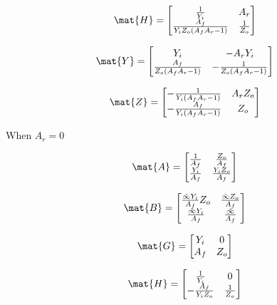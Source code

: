 \documentclass[a4paper, 12pt]{article}
\begin{document}
\begin{equation}
\mat{H} = \left[\begin{matrix}\frac{1}{Y_{i}} & A_{r}\\\frac{A_{f}}{Y_{i} Z_{o} \left(A_{f} A_{r} - 1\right)} & \frac{1}{Z_{o}}\end{matrix}\right]
\end{equation}

\begin{equation}
\mat{Y} = \left[\begin{matrix}Y_{i} & - A_{r} Y_{i}\\\frac{A_{f}}{Z_{o} \left(A_{f} A_{r} - 1\right)} & - \frac{1}{Z_{o} \left(A_{f} A_{r} - 1\right)}\end{matrix}\right]
\end{equation}

\begin{equation}
\mat{Z} = \left[\begin{matrix}- \frac{1}{Y_{i} \left(A_{f} A_{r} - 1\right)} & A_{r} Z_{o}\\- \frac{A_{f}}{Y_{i} \left(A_{f} A_{r} - 1\right)} & Z_{o}\end{matrix}\right]
\end{equation}


When $A_r=0$

\begin{equation}
\mat{A} = \left[\begin{matrix}\frac{1}{A_{f}} & \frac{Z_{o}}{A_{f}}\\\frac{Y_{i}}{A_{f}} & \frac{Y_{i} Z_{o}}{A_{f}}\end{matrix}\right]
\end{equation}

\begin{equation}
\mat{B} = \left[\begin{matrix}\frac{\tilde{\infty} Y_{i}}{A_{f}} Z_{o} & \frac{\tilde{\infty} Z_{o}}{A_{f}}\\\frac{\tilde{\infty} Y_{i}}{A_{f}} & \frac{\tilde{\infty}}{A_{f}}\end{matrix}\right]
\end{equation}

\begin{equation}
\mat{G} = \left[\begin{matrix}Y_{i} & 0\\A_{f} & Z_{o}\end{matrix}\right]
\end{equation}

\begin{equation}
\mat{H} =\left[\begin{matrix}\frac{1}{Y_{i}} & 0\\- \frac{A_{f}}{Y_{i} Z_{o}} & \frac{1}{Z_{o}}\end{matrix}\right]
\end{equation}
\end{document}

